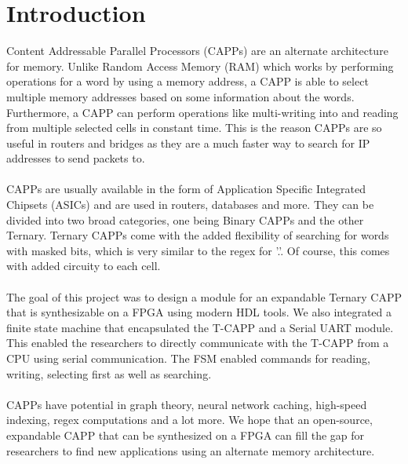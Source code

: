 \section{Introduction}
Content Addressable Parallel Processors (CAPPs) are an alternate architecture for memory. Unlike Random Access Memory (RAM) which works by 
performing operations for a word by using a memory address, a CAPP is able to select multiple memory addresses based on some information about the words. 
Furthermore, a CAPP can perform operations like multi-writing into and reading from multiple selected cells in constant time.
This is the reason CAPPs are so useful in routers and bridges as they are a much faster way to search for IP addresses to send packets to.
\\\\  
CAPPs are usually available in the form of Application Specific Integrated Chipsets (ASICs) and are used in routers, databases and more.
They can be divided into two broad categories, one being Binary CAPPs and the other Ternary. 
Ternary CAPPs come with the added flexibility of searching for words with masked bits, which is very similar to the regex for '.'. 
Of course, this comes with added circuity to each cell. 
\\\\ 
The goal of this project was to design a module for an expandable Ternary CAPP that is synthesizable on a FPGA using modern HDL tools. 
We also integrated a finite state machine that encapsulated the T-CAPP and a Serial UART module. 
This enabled the researchers to directly communicate with the T-CAPP from a CPU using serial communication.
The FSM enabled commands for reading, writing, selecting first as well as searching. 
\\\\
CAPPs have potential in graph theory, neural network caching, high-speed indexing, regex computations and a lot more. 
We hope that an open-source, expandable CAPP that can be synthesized on a FPGA can fill the gap for researchers to find new applications using an alternate memory architecture. 
